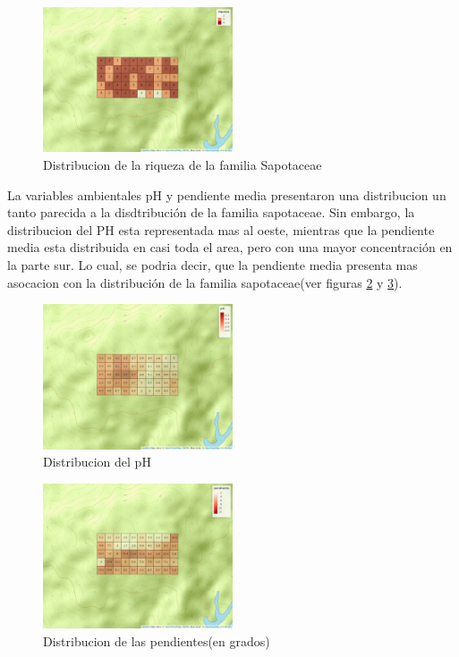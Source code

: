\documentclass[11pt,]{article}
\begin{document}
\begin{figure}
\centering
\includegraphics[width=0.50000\textwidth]{mapa_cuadros_riq_mi_familia.png}
\caption{Distribucion de la riqueza de la familia
Sapotaceae\label{fig:mapa_cuadros_riq_mi_familia}}
\end{figure}

La variables ambientales pH y pendiente media presentaron una
distribucion un tanto parecida a la disdtribución de la familia
sapotaceae. Sin embargo, la distribucion del PH esta representada mas al
oeste, mientras que la pendiente media esta distribuida en casi toda el
area, pero con una mayor concentración en la parte sur. Lo cual, se
podria decir, que la pendiente media presenta mas asocacion con la
distribución de la familia sapotaceae(ver figuras
\ref{fig:mapa_cuadros_pH} y \ref{fig:mapa_cuadros_pendiente}).

\begin{figure}
\centering
\includegraphics[width=0.50000\textwidth]{mapa_cuadros_ph.png}
\caption{Distribucion del pH\label{fig:mapa_cuadros_pH}}
\end{figure}

\begin{figure}
\centering
\includegraphics[width=0.50000\textwidth]{mapa_cuadros_pendiente.png}
\caption{Distribucion de las pendientes(en
grados)\label{fig:mapa_cuadros_pendiente}}
\end{figure}
\end{document}
